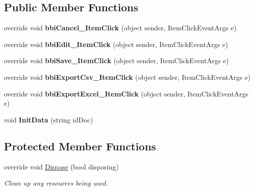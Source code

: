 \subsection*{Public Member Functions}
\begin{DoxyCompactItemize}
\item 
\mbox{\label{class_h_k_supply_1_1_forms_1_1_supply_1_1_quotation_proposal_a9eb2a03f288c2b87bf8d2e05c98eb636}} 
override void {\bfseries bbi\+Cancel\+\_\+\+Item\+Click} (object sender, Item\+Click\+Event\+Args e)
\item 
\mbox{\label{class_h_k_supply_1_1_forms_1_1_supply_1_1_quotation_proposal_a23e27c6099bba45e2000219646eaf314}} 
override void {\bfseries bbi\+Edit\+\_\+\+Item\+Click} (object sender, Item\+Click\+Event\+Args e)
\item 
\mbox{\label{class_h_k_supply_1_1_forms_1_1_supply_1_1_quotation_proposal_a8f67d5dd75c2106c5f5b85fcef22f800}} 
override void {\bfseries bbi\+Save\+\_\+\+Item\+Click} (object sender, Item\+Click\+Event\+Args e)
\item 
\mbox{\label{class_h_k_supply_1_1_forms_1_1_supply_1_1_quotation_proposal_ad9ab8964536ed7add5e5530fb13cc46b}} 
override void {\bfseries bbi\+Export\+Csv\+\_\+\+Item\+Click} (object sender, Item\+Click\+Event\+Args e)
\item 
\mbox{\label{class_h_k_supply_1_1_forms_1_1_supply_1_1_quotation_proposal_aaba39df0aa7642a380a4304d00ba111e}} 
override void {\bfseries bbi\+Export\+Excel\+\_\+\+Item\+Click} (object sender, Item\+Click\+Event\+Args e)
\item 
\mbox{\label{class_h_k_supply_1_1_forms_1_1_supply_1_1_quotation_proposal_acc763a67e187272b52ddd6d91c43e1ae}} 
void {\bfseries Init\+Data} (string id\+Doc)
\end{DoxyCompactItemize}
\subsection*{Protected Member Functions}
\begin{DoxyCompactItemize}
\item 
override void \mbox{\hyperlink{class_h_k_supply_1_1_forms_1_1_supply_1_1_quotation_proposal_a0f33f4fea55f3aeaced58d29f0005019}{Dispose}} (bool disposing)
\begin{DoxyCompactList}\small\item\em Clean up any resources being used. \end{DoxyCompactList}\end{DoxyCompactItemize}
